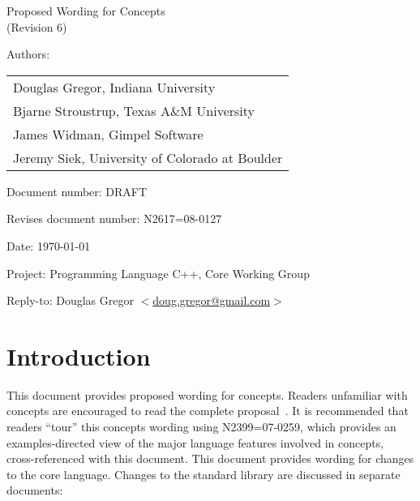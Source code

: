 \documentclass[american]{book}
\begin{document}
\raggedbottom

\begin{titlepage}
\huge
\begin{center}
Proposed Wording for Concepts\\
(Revision 6)
\end{center}

\normalsize
\vspace{0.25in}
\par\noindent Authors: 
\begin{tabular}[t]{l}
Douglas Gregor, Indiana University \\
Bjarne Stroustrup, Texas A\&M University \\
James Widman, Gimpel Software \\
Jeremy Siek, University of Colorado at Boulder
\end{tabular}\vspace{-6pt}

\par\noindent Document number: DRAFT \vspace{-6pt}
\par\noindent Revises document number: N2617=08-0127 \vspace{-6pt}
\par\noindent Date: \today\vspace{-6pt}
\par\noindent Project: Programming Language C++, Core Working Group\vspace{-6pt}
\par\noindent Reply-to: Douglas Gregor $<$\href{mailto:doug.gregor@gmail.com}{doug.gregor@gmail.com}$>$

\section*{Introduction}
This document provides proposed wording for concepts. Readers
unfamiliar with concepts are encouraged to read the complete
proposal~\cite{GregorStroustrup06:concepts_rev_1}. 
%
It is recommended that readers ``tour'' this concepts wording using
N2399=07-0259, which provides an examples-directed view of the major
language features involved in concepts, cross-referenced with this
document.  
%
This document
provides wording for changes to the core language. Changes to the
standard library are discussed in separate documents:


\end{titlepage}
\end{document}
